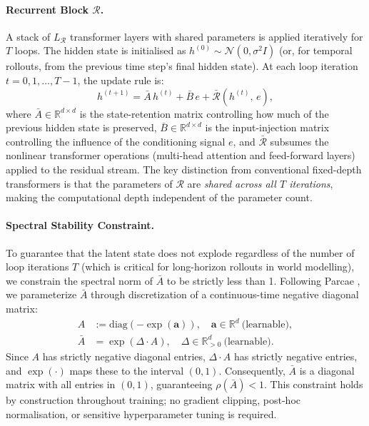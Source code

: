 \paragraph{Recurrent Block $\mathcal{R}$.}
A stack of $L_\mathcal{R}$ transformer layers with shared parameters is applied iteratively for $T$ loops. The hidden state is initialised as $h^{(0)} \sim \mathcal{N}(0, \sigma^2 I)$ (or, for temporal rollouts, from the previous time step's final hidden state). At each loop iteration $t = 0, 1, \ldots, T{-}1$, the update rule is:
\begin{equation}
  h^{(t+1)} = \bar{A}\, h^{(t)}
             + \bar{B}\, e
             + \bar{\mathcal{R}}(h^{(t)},\, e),
  \label{eq:recurrent_update}
\end{equation}
where $\bar{A} \in \mathbb{R}^{d \times d}$ is the state-retention matrix controlling how much of the previous hidden state is preserved, $\bar{B} \in \mathbb{R}^{d \times d}$ is the input-injection matrix controlling the influence of the conditioning signal $e$, and $\bar{\mathcal{R}}$ subsumes the nonlinear transformer operations (multi-head attention and feed-forward layers) applied to the residual stream. The key distinction from conventional fixed-depth transformers is that the parameters of $\mathcal{R}$ are \emph{shared across all $T$ iterations}, making the computational depth independent of the parameter count.

\paragraph{Spectral Stability Constraint.} To guarantee that the latent state does not explode regardless of the number of loop iterations $T$ (which is critical for long-horizon rollouts in world modelling), we constrain the spectral norm of $\bar{A}$ to be strictly less than 1. Following Parcae \citep{prairie2026parcae}, we parameterize $\bar{A}$ through discretization of a continuous-time negative diagonal matrix:
\begin{align}
  A &:= \mathrm{diag}\!\left(-\exp(\mathbf{a})\right),
      \quad \mathbf{a} \in \mathbb{R}^{d}~\text{(learnable)},
      \label{eq:A_continuous} \\
  \bar{A} &= \exp(\Delta \cdot A),
      \quad \Delta \in \mathbb{R}^{d}_{>0}~\text{(learnable)}.
      \label{eq:A_discrete}
\end{align}
Since $A$ has strictly negative diagonal entries, $\Delta \cdot A$ has strictly negative entries, and $\exp(\cdot)$ maps these to the interval $(0, 1)$. Consequently, $\bar{A}$ is a diagonal matrix with all entries in $(0, 1)$, guaranteeing $\rho(\bar{A}) < 1$. This constraint holds by construction throughout training; no gradient clipping, post-hoc normalisation, or sensitive hyperparameter tuning is required.

